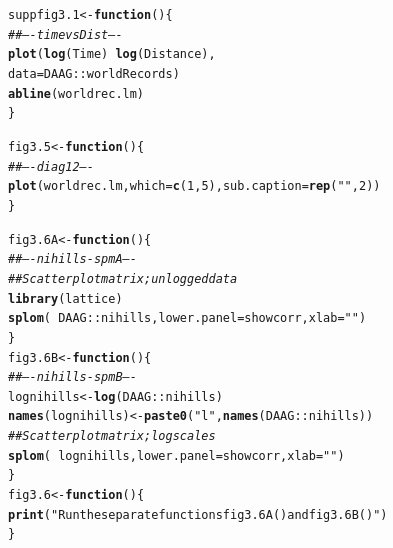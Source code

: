 \documentclass[12pt, a4paper,  BCOR=8.25mm, DIV=15]{scrartcl}\usepackage[]{graphicx}\usepackage[]{color}
\makeatletter
\newcommand{\hlnum}[1]{\textcolor[rgb]{0.686,0.059,0.569}{#1}}%
\newcommand{\hlstr}[1]{\textcolor[rgb]{0.192,0.494,0.8}{#1}}%
\newcommand{\hlcom}[1]{\textcolor[rgb]{0.678,0.584,0.686}{\textit{#1}}}%
\newcommand{\hlopt}[1]{\textcolor[rgb]{0,0,0}{#1}}%
\newcommand{\hlstd}[1]{\textcolor[rgb]{0.345,0.345,0.345}{#1}}%
\newcommand{\hlkwa}[1]{\textcolor[rgb]{0.161,0.373,0.58}{\textbf{#1}}}%
\newcommand{\hlkwb}[1]{\textcolor[rgb]{0.69,0.353,0.396}{#1}}%
\newcommand{\hlkwc}[1]{\textcolor[rgb]{0.333,0.667,0.333}{#1}}%
\newcommand{\hlkwd}[1]{\textcolor[rgb]{0.737,0.353,0.396}{\textbf{#1}}}%
\newenvironment{kframe}{%
 \def\at@end@of@kframe{}%
 \ifinner\ifhmode%
  \def\at@end@of@kframe{\end{minipage}}%
  \begin{minipage}{\columnwidth}%
 \fi\fi%
 \def\FrameCommand##1{\hskip\@totalleftmargin \hskip-\fboxsep
 \colorbox{shadecolor}{##1}\hskip-\fboxsep
     \hskip-\linewidth \hskip-\@totalleftmargin \hskip\columnwidth}%
 \MakeFramed {\advance\hsize-\width
   \@totalleftmargin\z@ \linewidth\hsize
   \@setminipage}}%
 {\par\unskip\endMakeFramed%
 \at@end@of@kframe}
\newenvironment{knitrout}{}{} %
\makeatother
\begin{document}
\begin{knitrout}
\color{fgcolor}\begin{kframe}
\begin{alltt}
\hlstd{suppfig3.1} \hlkwb{<-} \hlkwa{function}\hlstd{()\{}
\hlcom{## ---- timevsDist ----}
\hlkwd{plot}\hlstd{(}\hlkwd{log}\hlstd{(Time)} \hlopt{~} \hlkwd{log}\hlstd{(Distance),}
     \hlkwc{data} \hlstd{= DAAG}\hlopt{::}\hlstd{worldRecords)}
\hlkwd{abline}\hlstd{(worldrec.lm)}
\hlstd{\}}
\end{alltt}
\end{kframe}
\end{knitrout}

\begin{knitrout}
\color{fgcolor}\begin{kframe}
\begin{alltt}
\hlstd{fig3.5} \hlkwb{<-} \hlkwa{function}\hlstd{()\{}
\hlcom{## ---- diag12 ----}
\hlkwd{plot}\hlstd{(worldrec.lm,} \hlkwc{which}\hlstd{=}\hlkwd{c}\hlstd{(}\hlnum{1}\hlstd{,}\hlnum{5}\hlstd{),} \hlkwc{sub.caption}\hlstd{=}\hlkwd{rep}\hlstd{(}\hlstr{""}\hlstd{,}\hlnum{2}\hlstd{))}
\hlstd{\}}
\end{alltt}
\end{kframe}
\end{knitrout}



\begin{knitrout}
\color{fgcolor}\begin{kframe}
\begin{alltt}
\hlstd{fig3.6A} \hlkwb{<-} \hlkwa{function}\hlstd{()\{}
\hlcom{## ---- nihills-spmA ----}
\hlcom{## Scatterplot matrix; unlogged data}
\hlkwd{library}\hlstd{(lattice)}
\hlkwd{splom}\hlstd{(}\hlopt{~}\hlstd{DAAG}\hlopt{::}\hlstd{nihills,}  \hlkwc{lower.panel}\hlstd{=showcorr,} \hlkwc{xlab}\hlstd{=}\hlstr{""}\hlstd{)}
\hlstd{\}}
\hlstd{fig3.6B} \hlkwb{<-} \hlkwa{function}\hlstd{()\{}
\hlcom{## ---- nihills-spmB ----}
\hlstd{lognihills} \hlkwb{<-} \hlkwd{log}\hlstd{(DAAG}\hlopt{::}\hlstd{nihills)}
\hlkwd{names}\hlstd{(lognihills)} \hlkwb{<-} \hlkwd{paste0}\hlstd{(}\hlstr{"l"}\hlstd{,} \hlkwd{names}\hlstd{(DAAG}\hlopt{::}\hlstd{nihills))}
\hlcom{## Scatterplot matrix; log scales}
\hlkwd{splom}\hlstd{(}\hlopt{~} \hlstd{lognihills,} \hlkwc{lower.panel}\hlstd{=showcorr,} \hlkwc{xlab}\hlstd{=}\hlstr{""}\hlstd{)}
\hlstd{\}}
\hlstd{fig3.6} \hlkwb{<-} \hlkwa{function}\hlstd{()\{}
  \hlkwd{print}\hlstd{(}\hlstr{"Run the separate functions fig3.6A() and fig3.6B()"}\hlstd{)}
\hlstd{\}}
\end{alltt}
\end{kframe}
\end{knitrout}
\end{document}
